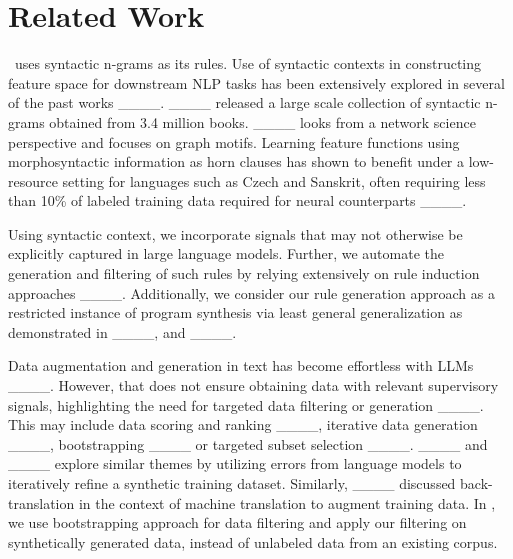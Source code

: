 \section{Related Work}
\our~uses syntactic n-grams as its rules. Use of syntactic contexts in constructing feature space for downstream NLP tasks has been extensively explored in several of the past works ____. ____ released a large scale collection of syntactic n-grams obtained from 3.4 million books. ____ looks from a network science perspective and focuses on graph motifs. Learning feature functions using morphosyntactic information as horn clauses has shown to benefit under a low-resource setting for languages such as Czech and Sanskrit, often requiring less than 10\% of labeled training data required for neural counterparts ____. 

Using syntactic context, we incorporate signals that may not otherwise be explicitly captured in large language models. Further, we automate the generation and filtering of such rules by relying extensively on rule induction approaches ____. Additionally, we consider our rule generation approach as a restricted instance of program synthesis via least general generalization as demonstrated in ____, and ____.

Data augmentation and generation in text has become effortless with LLMs ____. However, that does not ensure obtaining data with relevant supervisory signals, highlighting the need for targeted data filtering or generation ____. This may include data scoring and ranking ____, iterative data generation ____, bootstrapping ____ or targeted subset selection ____. ____ and ____ explore similar themes by utilizing errors from language models to iteratively refine a synthetic training dataset. Similarly, ____ discussed back-translation in the context of machine translation to augment training data. In \our, we use bootstrapping approach for data filtering and apply our filtering on synthetically generated data, instead of unlabeled data from an existing corpus.